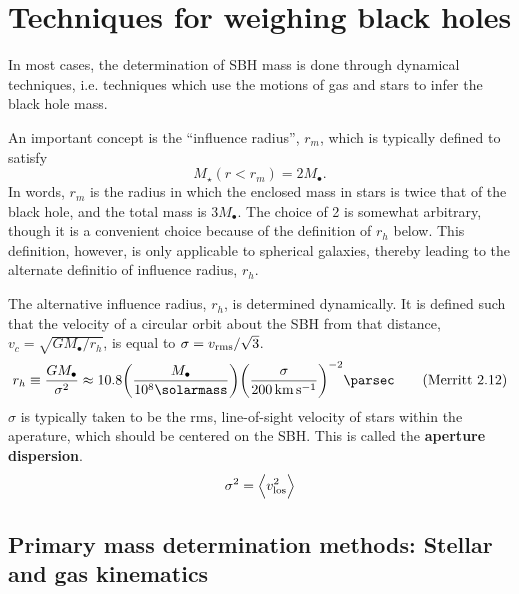 \documentclass[degn-notes.tex]{subfiles}
\begin{document}
\section{Techniques for weighing black holes}

In most cases, the determination of SBH mass is done through dynamical techniques, i.e. techniques which use the motions of gas and stars to infer the black hole mass.

An important concept is the ``influence radius'', $r_m$, which is typically defined to satisfy
%
\begin{displaymath}
  M_\star(r < r_m) = 2 M_\bullet.
%
  \tag{Merritt 2.11}
  \label{merritt:2.11}
\end{displaymath}
%
In words, $r_m$ is the radius in which the enclosed mass in stars is twice that of the black hole, and the total mass is $3 M_\bullet$. The choice of 2 is somewhat arbitrary, though it is a convenient choice because of the definition of $r_h$ below. This definition, however, is only applicable to spherical galaxies, thereby leading to the alternate definitio of influence radius, $r_h$.

The alternative influence radius, $r_h$, is determined dynamically. It is defined such that the velocity of a circular orbit about the SBH from that distance, $v_c = \sqrt{G M_\bullet / r_h}$, is equal to $\sigma = v_{\rm rms} / \sqrt{3}$.
%
\begin{displaymath}
  r_h \equiv
  \frac{G M_\bullet}{\sigma^2} \approx
  10.8 \qty(\frac{M_\bullet}{10^8 \si{\solarmass}})
       \qty(\frac{\sigma}{\SI{200}{\kilo\meter\per\second}})^{-2} \si{\parsec}
%
  \tag{Merritt 2.12}
  \label{merritt:2.12}
\end{displaymath}
%
$\sigma$ is typically taken to be the rms, line-of-sight velocity of stars within the aperature, which should be centered on the SBH. This is called the \textbf{aperture dispersion}.
%
\begin{equation}
  \sigma^2 = \expval{v_{\mathrm{los}}^2}
%
  \label{eqn:aperture-dispersion}
\end{equation}


\subsection{Primary mass determination methods: Stellar and gas kinematics}
\end{document}
